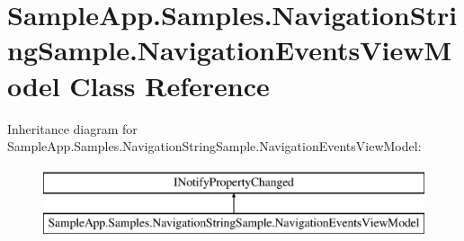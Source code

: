 \hypertarget{class_sample_app_1_1_samples_1_1_navigation_string_sample_1_1_navigation_events_view_model}{}\section{Sample\+App.\+Samples.\+Navigation\+String\+Sample.\+Navigation\+Events\+View\+Model Class Reference}
\label{class_sample_app_1_1_samples_1_1_navigation_string_sample_1_1_navigation_events_view_model}
Inheritance diagram for Sample\+App.\+Samples.\+Navigation\+String\+Sample.\+Navigation\+Events\+View\+Model\+:\begin{figure}[H]
\begin{center}
\leavevmode
\includegraphics[height=2.000000cm]{class_sample_app_1_1_samples_1_1_navigation_string_sample_1_1_navigation_events_view_model}
\end{center}
\end{figure}
